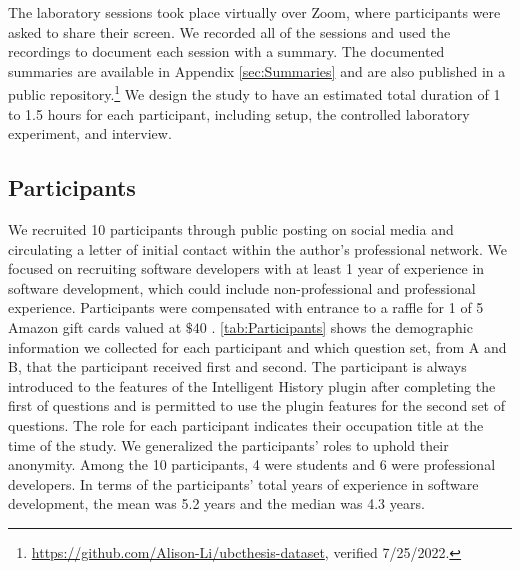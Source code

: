 The laboratory sessions took place virtually over Zoom, where participants were asked to share their screen.
We recorded all of the sessions and used the recordings to document each session with a summary.
The documented summaries are available in Appendix \ref{sec:Summaries} 
and are also published in a public repository.\footnote{\url{https://github.com/Alison-Li/ubcthesis-dataset}, verified 7/25/2022.}
We design the study to have an estimated total duration of 1 to 1.5 hours for each participant,
including setup, the controlled laboratory experiment, and interview.

\subsection{Participants}

We recruited 10 participants through public posting on social media and circulating a letter of initial contact within the author's professional network.
We focused on recruiting software developers with at least 1 year of experience in software development, 
which could include non-professional and professional experience.
Participants were compensated with entrance to a raffle for 1 of 5 Amazon gift cards valued at $\$40$ .
\autoref{tab:Participants} shows the demographic information we collected for each participant and 
which question set, from A and B, that the participant received first and second.
The participant is always introduced to the features of the Intelligent History plugin after completing the first of questions and 
is permitted to use the plugin features for the second set of questions.
The role for each participant indicates their occupation title at the time of the study.
We generalized the participants' roles to uphold their anonymity.
Among the 10 participants, 4 were students and 6 were professional developers.
In terms of the participants' total years of experience in software development, 
the mean was 5.2 years and the median was 4.3 years.

